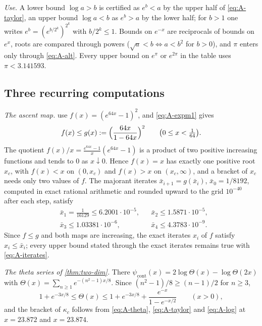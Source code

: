\documentclass[11pt,a4paper]{amsart}
\theoremstyle{definition}
\theoremstyle{remark}
\numberwithin{equation}{section}
\newcommand{\xconst}{\frac{1}{8192}}       %
\newcommand{\xconstinl}{1/8192}            %
\begin{document}
\emph{Use.} A lower bound $\log a>b$ is certified as $e^{b}<a$ by the upper half of \eqref{eq:A-taylor}, an upper bound $\log a<b$ as $e^{b}>a$ by the lower half; for $b>1$ one writes $e^{b}=(e^{b/2^k})^{2^k}$ with $b/2^k\le1$. Bounds on $e^{-x}$ are reciprocals of bounds on $e^{x}$, roots are compared through powers ($\sqrt a<b\iff a<b^2$ for $b>0$), and $\pi$ enters only through \eqref{eq:A-alt}. Every upper bound on $e^{\pi}$ or $e^{2\pi}$ in the table uses $\pi<3.141593$.

\subsection{Three recurring computations}
\emph{The ascent map.}  use $f(x)=(e^{64x}-1)^2$, and \eqref{eq:A-expm1} gives
\begin{equation}\label{eq:A-majorant}
f(x)\le g(x):=\Bigl(\frac{64x}{1-64x}\Bigr)^{2}\qquad\bigl(0\le x<\tfrac1{64}\bigr).
\end{equation}
The quotient $f(x)/x=\frac{e^{64x}-1}{x}(e^{64x}-1)$ is a product of two positive increasing functions and tends to $0$ as $x\downarrow0$. Hence $f(x)=x$ has exactly one positive root $x_c$, with $f(x)<x$ on $(0,x_c)$ and $f(x)>x$ on $(x_c,\infty)$, and a bracket of $x_c$ needs only two values of $f$. The majorant iterates $\bar x_{i+1}=g(\bar x_i)$, $\bar x_0=\xconstinl$, computed in exact rational arithmetic and rounded upward to the grid $10^{-40}$ after each step, satisfy
\begin{equation}\label{eq:A-iterates}
\begin{aligned}
&\bar x_1=\tfrac1{16129}\le6.2001\cdot10^{-5},&&\bar x_2\le1.5871\cdot10^{-5},\\
&\bar x_3\le1.03381\cdot10^{-6},&&\bar x_4\le4.3783\cdot10^{-9}.
\end{aligned}
\end{equation}
Since $f\le g$ and both maps are increasing, the exact iterates $x_i$ of $f$ satisfy $x_i\le\bar x_i$; every upper bound stated through the exact iterates remains true with \eqref{eq:A-iterates}.

\emph{The theta series of \cref{thm:two-dim}.} There $\psi_{\mathrm{cont}}(x)=2\log\Theta(x)-\log\Theta(2x)$ with $\Theta(x)=\sum_{n\ge1}e^{-(n^2-1)x/8}$. Since $(n^2-1)/8\ge(n-1)/2$ for $n\ge3$,
\begin{equation}\label{eq:A-theta}
1+e^{-3x/8}\le\Theta(x)\le1+e^{-3x/8}+\frac{e^{-x}}{1-e^{-x/2}}\qquad(x>0),
\end{equation}
and the bracket of $\kappa_c$ follows from \eqref{eq:A-theta}, \eqref{eq:A-taylor} and \eqref{eq:A-log} at $x=23.872$ and $x=23.874$.
\end{document}
